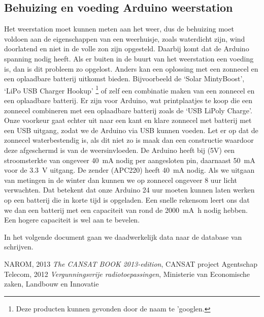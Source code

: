 \subsection{Behuizing en voeding Arduino weerstation}
Het weerstation moet kunnen
meten aan het weer, dus de behuizing moet voldoen aan de eigenschappen
van een weerhuisje, zoals waterdicht zijn, wind doorlatend en niet in de
volle zon zijn opgesteld. Daarbij komt dat de Arduino spanning nodig heeft. Als
er buiten in de buurt van het weerstation een voeding is, dan is dit
probleem zo opgelost. Anders kan een oplossing met een zonnecel
en een oplaadbare batterij uitkomst bieden. Bijvoorbeeld de `Solar
MintyBoost', `LiPo USB Charger Hookup' \footnote{Deze producten kunnen
gevonden door de naam te 'googlen.} of zelf een combinatie maken van een
zonnecel en een oplaadbare batterij. Er zijn voor Arduino, wat
printplaatjes te koop die een zonnecel combineren met een oplaadbare
batterij zoals de `USB LiPoly Charge'. Onze voorkeur gaat echter uit
naar een kant en klare zonnecel met batterij met een USB uitgang, zodat we de Arduino
via USB kunnen voeden. Let er op dat de zonnecel waterbestendig is, als dit niet zo is maak dan een
constructie waardoor deze afgeschermd is van de weersinvloeden.
De Arduino heeft bij (5V) een stroomsterkte van ongeveer \SI{40}{\milli\ampere} nodig per
aangesloten pin, daarnaast \SI{50}{\milli\ampere} voor de \SI{3,3}{\volt} uitgang.
De zender (APC220) heeft \SI{40}{\milli\ampere} nodig.
Als we uitgaan van metingen in de winter dan kunnen we op zonnecel ongeveer
8 uur licht verwachten. Dat betekent dat onze Arduino 24 uur moeten kunnen laten werken
op een batterij die in korte tijd is opgeladen.
Een snelle rekensom leert ons dat we dan een batterij met een capaciteit van rond
de \SI{2000}{\milli\ampere\hour} nodig hebben. Een hogere capaciteit is wel aan te bevelen.

In het volgende document gaan we daadwerkelijk data naar de database van \hisparc schrijven.

\begin{thebibliography}{9}
        NAROM, 2013 \emph{The CANSAT BOOK 2013-edition},
        CANSAT project
    Agentschap Telecom, 2012 \emph{Vergunningsvrije radiotoepassingen},
    Ministerie van Economische zaken, Landbouw en Innovatie
\end{thebibliography}



